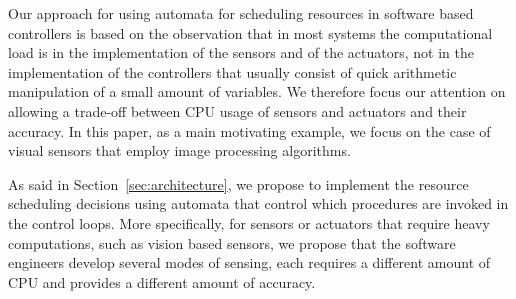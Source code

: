 \documentclass{sig-alternate-ipsn13}
\begin{document}
Our approach for using automata for scheduling resources in software based controllers is based on the observation that in most systems the computational load is in the implementation of the sensors and of the actuators, not in the implementation of the controllers that usually consist of quick arithmetic manipulation of a small amount of variables. We therefore focus our attention on allowing a trade-off between CPU usage of sensors and actuators and their accuracy. In this paper, as a main motivating example, we focus on the case of visual sensors that employ image processing algorithms.

As said in Section~\ref{sec:architecture}, we propose to implement the resource scheduling decisions using automata that control which procedures are invoked in the control loops. More specifically, for sensors or actuators that require heavy computations, such as vision based sensors, we propose that the software engineers develop several modes of sensing, each requires a different amount of CPU and provides a different amount of accuracy.  


%    
%    
%    
%
%
\end{document}

